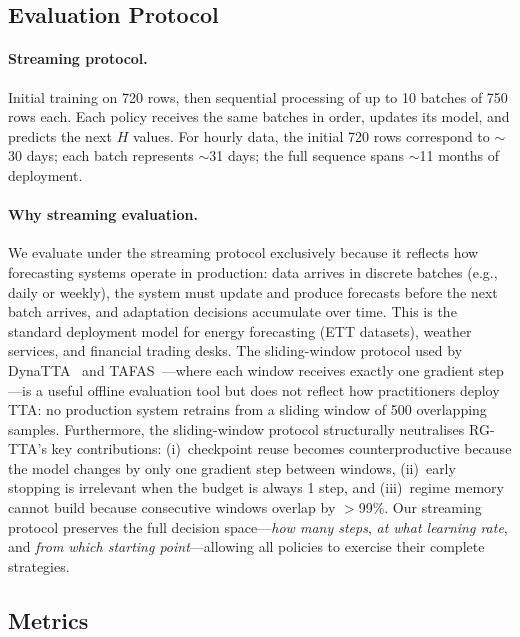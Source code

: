 \documentclass[11pt,a4paper]{article}
\begin{document}
\subsection{Evaluation Protocol}

\paragraph{Streaming protocol.} Initial training on 720 rows, then sequential processing of up to 10 batches of 750 rows each. Each policy receives the same batches in order, updates its model, and predicts the next $H$ values. For hourly data, the initial 720 rows correspond to $\sim$30 days; each batch represents $\sim$31 days; the full sequence spans $\sim$11 months of deployment.

\paragraph{Why streaming evaluation.} We evaluate under the streaming protocol exclusively because it reflects how forecasting systems operate in production: data arrives in discrete batches (e.g., daily or weekly), the system must update and produce forecasts before the next batch arrives, and adaptation decisions accumulate over time. This is the standard deployment model for energy forecasting (ETT datasets), weather services, and financial trading desks. The sliding-window protocol used by DynaTTA~\citep{grover2025dynatta} and TAFAS~\citep{kim2025tafas}---where each window receives exactly one gradient step---is a useful offline evaluation tool but does not reflect how practitioners deploy TTA: no production system retrains from a sliding window of 500 overlapping samples. Furthermore, the sliding-window protocol structurally neutralises RG-TTA's key contributions: (i)~checkpoint reuse becomes counterproductive because the model changes by only one gradient step between windows, (ii)~early stopping is irrelevant when the budget is always 1 step, and (iii)~regime memory cannot build because consecutive windows overlap by $>$99\%. Our streaming protocol preserves the full decision space---\emph{how many steps}, \emph{at what learning rate}, and \emph{from which starting point}---allowing all policies to exercise their complete strategies.

\subsection{Metrics}
\end{document}
